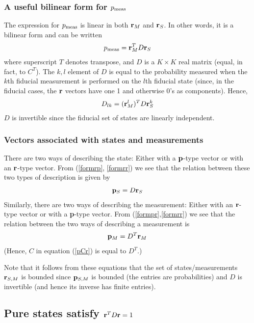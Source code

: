 \documentclass[12pt]{article}
\begin{document}
\subsubsection{A useful bilinear form for $p_{\rm meas}$}

The expression for $p_{\rm meas}$ is linear in both
${\bf r}_M$ and ${\bf r}_S$.  In other words, it is a bilinear form and can
be written
\begin{equation}\label{formrr}
   p_{\rm meas} = {\bf r}_M^T D {\bf r}_S
\end{equation}
where superscript $T$ denotes transpose, and
$D$ is a $K\times K$ real matrix (equal, in fact, to $C^T$).
The $k,l$ element of $D$ is
equal to the probability measured when the $k$th fiducial measurement is
performed on the $l$th fiducial state (since, in the fiducial cases,
the ${\bf r}$ vectors have one 1 and otherwise 0's as components).
Hence,
\begin{equation}\label{formfid}
D_{lk}=({\bf r}^l_M)^T D {\bf r}^k_S
\end{equation}
$D$ is invertible since the fiducial set of states are linearly
independent.

\subsubsection{Vectors associated with states and measurements}

There are two ways of describing the state:  Either with a ${\bf
p}$-type vector or with an ${\bf r}$-type vector.  From (\ref{formrp},
\ref{formrr}) we see that the relation between these two types of
description is given by
\begin{equation}\label{pDr}
{\bf p}_S = D {\bf r}_S
\end{equation}
Similarly, there are two ways of describing the measurement: Either with
an ${\bf r}$-type vector or with a {\bf p}-type vector.  From
(\ref{formpr},\ref{formrr}) we see that the relation
between the two ways of describing a measurement is
\begin{equation}
{\bf p}_M = D^T {\bf r}_M
\end{equation}
(Hence, $C$ in equation (\ref{pCr}) is equal to $D^T$.)

Note that it follows from these equations that the set of
states/measurements ${\bf r}_{S,M}$ is bounded since ${\bf p}_{S,M}$ is
bounded (the entries are probabilities) and $D$ is invertible (and hence
its inverse has finite entries).

\subsection{Pure states satisfy ${\bf r}^T D {\bf r}=1$}
\end{document}
